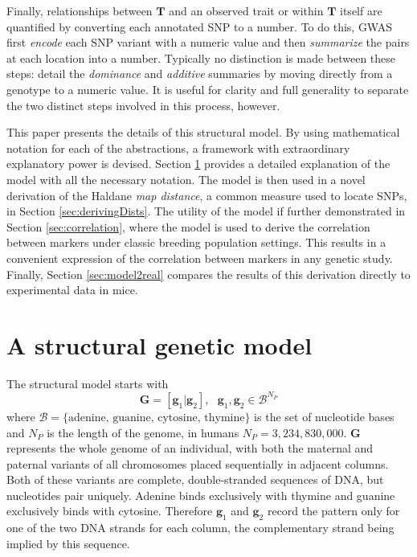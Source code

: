 \documentclass{article}
\newcommand{\ve}[1]{\mathbf{#1}}           %
\newcommand{\m}[1]{\mathbf{#1}}               %
\begin{document}
Finally, relationships between $\m{T}$ and an observed trait or within $\m{T}$ itself are quantified by converting each annotated SNP to a number. To do this, GWAS first \emph{encode} each SNP variant with a numeric value and then \emph{summarize} the pairs at each location into a number. Typically no distinction is made between these steps: \cite{LanderBotstein1989, cheverud2001, siegmundyakir2007} detail the \emph{dominance} and \emph{additive} summaries by moving directly from a genotype to a numeric value. It is useful for clarity and full generality to separate the two distinct steps involved in this process, however.

This paper presents the details of this structural model. By using mathematical notation for each of the abstractions, a framework with extraordinary explanatory power is devised. Section \ref{sec:theModel} provides a detailed explanation of the model with all the necessary notation. The model is then used in a novel derivation of the Haldane \emph{map distance}, a common measure used to locate SNPs, in Section \ref{sec:derivingDists}. The utility of the model if further demonstrated in Section \ref{sec:correlation}, where the model is used to derive the correlation between markers under classic breeding population settings. This results in a convenient expression of the correlation between markers in any genetic study. Finally, Section \ref{sec:model2real} compares the results of this derivation directly to experimental data in mice.

\section{A structural genetic model} \label{sec:theModel}

The structural model starts with
$$\m{G} = [\ve{g}_1| \ve{g}_2], \text{ } \ve{g}_1, \ve{g}_2 \in \mathcal{B}^{N_P}$$
where $\mathcal{B} = \{\text{adenine, guanine, cytosine, thymine}\}$ is the set of nucleotide bases and $N_P$ is the length of the genome, in humans $N_P = 3,234,830,000$. $\m{G}$ represents the whole genome of an individual, with both the maternal and paternal variants of all chromosomes placed sequentially in adjacent columns. Both of these variants are complete, double-stranded sequences of DNA, but nucleotides pair uniquely. Adenine binds exclusively with thymine and guanine exclusively binds with cytosine. Therefore $\ve{g}_1$ and $\ve{g}_2$ record the pattern only for one of the two DNA strands for each column, the complementary strand being implied by this sequence.
\end{document}
